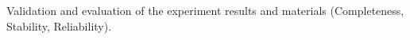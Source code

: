 Validation and evaluation of the experiment results and materials (Completeness, Stability, Reliability). 
